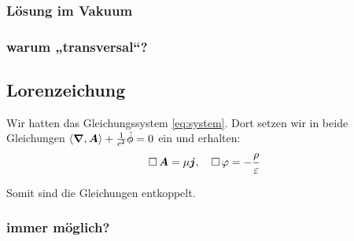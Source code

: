 \fehlt

\subsubsection{Lösung im Vakuum}

\subsubsection{warum „transversal“?}

\fehlt

\subsection{Lorenzeichung}

Wir hatten das Gleichungssystem \eqref{eq:system}. Dort setzen wir in beide
Gleichungen $\left\langle \boldsymbol{\nabla}, \boldsymbol{A} \right\rangle + \frac{1}{c^2} \dot \phi = 0$ ein und
erhalten:
\[
	\mathop{{}\Box}\nolimits \boldsymbol{A} = \mu \boldsymbol{j}
	,\quad
	\mathop{{}\Box}\nolimits \varphi = - \frac \rho \varepsilon
\]

Somit sind die Gleichungen entkoppelt.

\subsubsection{immer möglich?}

\fehlt

%
%



